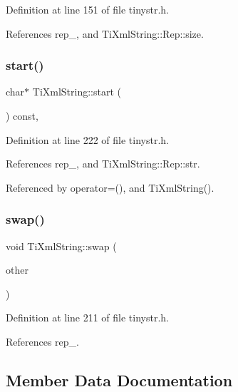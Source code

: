 Definition at line 151 of file tinystr.\+h.



References rep\+\_\+, and Ti\+Xml\+String\+::\+Rep\+::size.

\hypertarget{class_ti_xml_string_ad078fd9ba77fee5d9bfb6706466efbf3}{}\label{class_ti_xml_string_ad078fd9ba77fee5d9bfb6706466efbf3} 
\subsubsection{\texorpdfstring{start()}{start()}}
{\footnotesize\ttfamily char$\ast$ Ti\+Xml\+String\+::start (\begin{DoxyParamCaption}{ }\end{DoxyParamCaption}) const\hspace{0.3cm}{\ttfamily [inline]}, {\ttfamily [private]}}



Definition at line 222 of file tinystr.\+h.



References rep\+\_\+, and Ti\+Xml\+String\+::\+Rep\+::str.



Referenced by operator=(), and Ti\+Xml\+String().

\hypertarget{class_ti_xml_string_aa392cbc180752a79f007f4f9280c7762}{}\label{class_ti_xml_string_aa392cbc180752a79f007f4f9280c7762} 
\subsubsection{\texorpdfstring{swap()}{swap()}}
{\footnotesize\ttfamily void Ti\+Xml\+String\+::swap (\begin{DoxyParamCaption}\item[{\hyperlink{class_ti_xml_string}{Ti\+Xml\+String} \&}]{other }\end{DoxyParamCaption})\hspace{0.3cm}{\ttfamily [inline]}}



Definition at line 211 of file tinystr.\+h.



References rep\+\_\+.



\subsection{Member Data Documentation}
\hypertarget{class_ti_xml_string_a1aa6260982d3a63f0c822fe40fd7b37f}{}\label{class_ti_xml_string_a1aa6260982d3a63f0c822fe40fd7b37f} 
